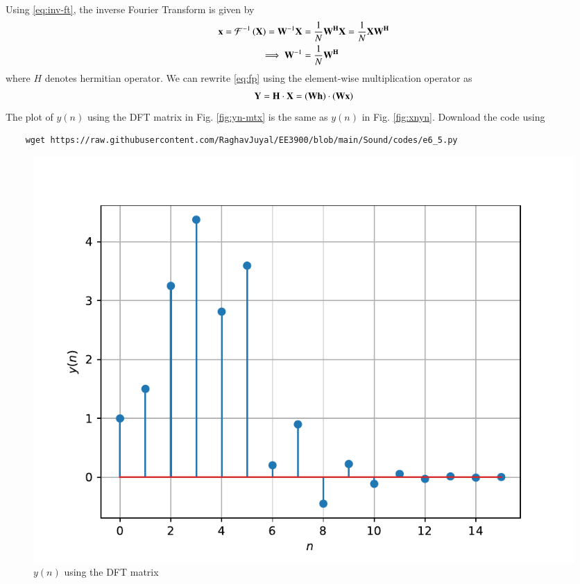 \documentclass[journal,12pt,twocolumn]{IEEEtran}
\renewcommand\thesection{\arabic{section}}
\begin{document}
\begin{enumerate}[label=\thesection.\arabic*]
\begin{align}
\end{align}
\noindent Using \eqref{eq:inv-ft}, the inverse Fourier Transform is given by
\begin{align}
	\mathbf{x} = \mathcal{F}^{-1}\left(\mathbf{X}\right) = \mathbf{W}^{-1}\mathbf{X} &= 
	\frac{1}{N}\mathbf{W^{H}}\mathbf{X} = \frac{1}{N}\mathbf{X}\mathbf{W^{H}} \\ 
	\implies \mathbf{W}^{-1} &= \frac{1}{N}\mathbf{W^{H}}
\end{align}
\noindent where $H$ denotes hermitian operator. We can rewrite \eqref{eq:fp} using the
element-wise multiplication operator as
\begin{align}
	\mathbf{Y} = \mathbf{H}\cdot\mathbf{X} = \left(\mathbf{W}\mathbf{h}\right)\cdot\left(\mathbf{W}\mathbf{x}\right)
\end{align}
The plot of $y(n)$ using the DFT matrix in Fig. \eqref{fig:yn-mtx} is the same as $y(n)$ in 
Fig. \eqref{fig:xnyn}. Download the code using
\begin{lstlisting}
	wget https://raw.githubusercontent.com/RaghavJuyal/EE3900/blob/main/Sound/codes/e6_5.py
\end{lstlisting}
\end{enumerate}
\begin{figure}[!htb]
\centering
\includegraphics[width=\columnwidth]{figs/prob_6-5.pdf}
\caption{$y(n)$ using the DFT matrix}
\label{fig:yn-mtx}
\end{figure}
\end{document}
